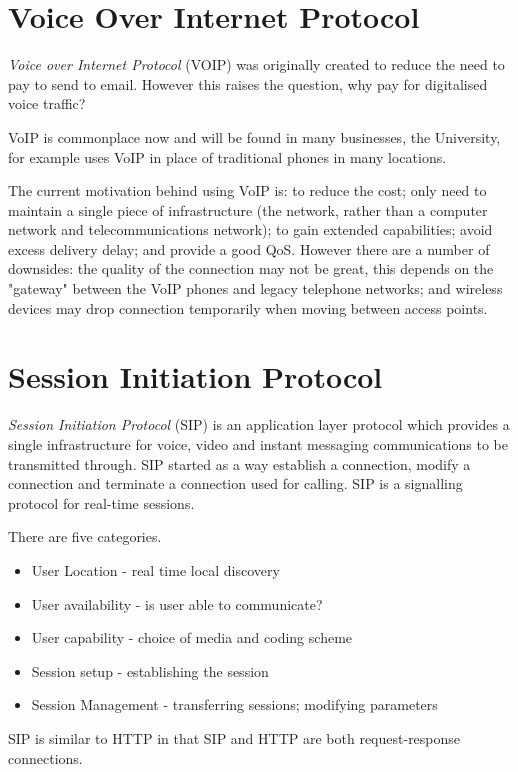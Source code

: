 
\section*{Voice Over Internet Protocol}
\textit{Voice over Internet Protocol} (VOIP) was originally created to reduce the need to pay to send to email. However this raises the question, why pay for digitalised voice traffic?

VoIP is commonplace now and will be found in many businesses, the University, for example uses VoIP in place of traditional phones in many locations.

The current motivation behind using VoIP is: to reduce the cost; only need to maintain a single piece of infrastructure (the network, rather than a computer network and telecommunications network); to gain extended capabilities; avoid excess delivery delay; and provide a good QoS. However there are a number of downsides: the quality of the connection may not be great, this depends on the "gateway" between the VoIP phones and legacy telephone networks; and wireless devices may drop connection temporarily when moving between access points. 

\section*{Session Initiation Protocol}
\textit{Session Initiation Protocol} (SIP) is an application layer protocol which provides a single infrastructure for voice, video and instant messaging communications to be transmitted through. SIP started as a way establish a connection, modify a connection and terminate a connection used for calling. SIP is a signalling protocol for real-time sessions.

There are five categories.
\begin{itemize}
    \item User Location - real time local discovery
    \item User availability - is user able to communicate?
    \item User capability - choice of media and coding scheme
    \item Session setup - establishing the session
    \item Session Management - transferring sessions; modifying parameters
\end{itemize}

SIP is similar to HTTP in that SIP and HTTP are both request-response connections.

